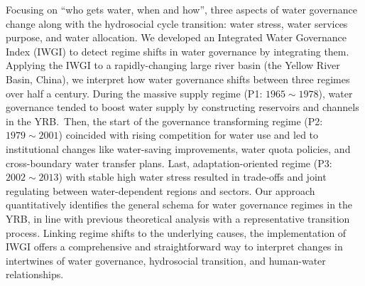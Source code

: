 Focusing on ``who gets water, when and how'', three aspects of water governance change along with the hydrosocial cycle transition: water stress, water services purpose, and water allocation.
We developed an Integrated Water Governance Index (IWGI) to detect regime shifts in water governance by integrating them. Applying the IWGI to a rapidly-changing large river basin (the Yellow River Basin, China), we interpret how water governance shifts between three regimes over half a century.
During the massive supply regime (P1: $1965 \sim 1978$), water governance tended to boost water supply by constructing reservoirs and channels in the YRB.\
Then, the start of the governance transforming regime (P2: $1979 \sim 2001$) coincided with rising competition for water use and led to institutional changes like water-saving improvements, water quota policies, and cross-boundary water transfer plans.
Last, adaptation-oriented regime (P3: $2002 \sim 2013$) with stable high water stress resulted in trade-offs and joint regulating between water-dependent regions and sectors.
Our approach quantitatively identifies the general schema for water governance regimes in the YRB, in line with previous theoretical analysis with a representative transition process.
Linking regime shifts to the underlying causes, the implementation of IWGI offers a comprehensive and straightforward way to interpret changes in intertwines of water governance, hydrosocial transition, and human-water relationships.
